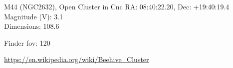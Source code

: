 \begin{block}{M44 (NGC2632), Open Cluster in Cnc}
    RA: 08:40:22.20, Dec: +19:40:19.4 \\ 
    Magnitude (V): 3.1 \\ 
    Dimensions: 108.6 

    Finder fov: 120 

    \url{https://en.wikipedia.org/wiki/Beehive_Cluster} 
\end{block}